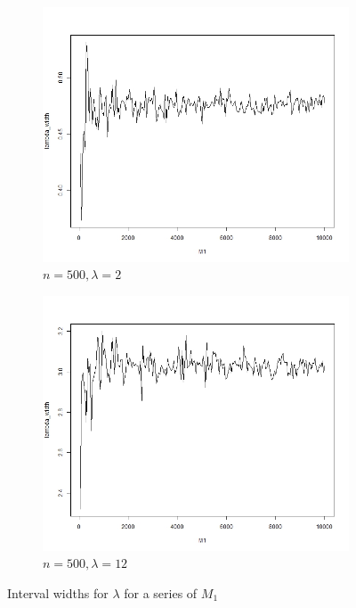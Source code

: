 \documentclass{article}
\begin{document}
\begin{figure}[!htb]
    	\begin{subfigure}[b]{0.5\textwidth}
    	\includegraphics[width = \textwidth]{./Codes/lambda_500_2.jpg}
    	\caption{$n = 500, \lambda = 2$}
    	\end{subfigure}%
    	\begin{subfigure}[b]{0.5\textwidth}
    	\includegraphics[width = \textwidth]{./Codes/lambda_500_12.jpg}
    	\caption{$n = 500, \lambda = 12$}
    	\end{subfigure}
    	\caption{Interval widths for $\lambda$ for a series of $M_1$}
    	\label{chooseM1_lambda}
    \end{figure}
\end{document}

